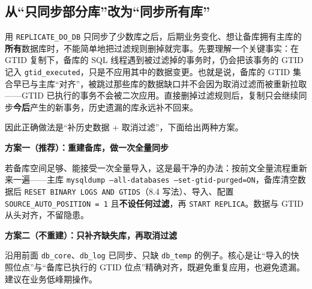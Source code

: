 \documentclass[12pt,UTF8]{ctexbook}
\begin{document}
\subsection{从“只同步部分库”改为“同步所有库”}
\label{sec:filter-to-all}

用 \texttt{REPLICATE\_DO\_DB} 只同步了少数库之后，后期业务变化、想让备库拥有主库的\textbf{所有}数据库时，不能简单地把过滤规则删掉就完事。先要理解一个关键事实：在 GTID 复制下，备库的 SQL 线程遇到被过滤掉的事务时，仍会把该事务的 GTID 记入 \texttt{gtid\_executed}，只是不应用其中的数据变更。也就是说，备库的 GTID 集合早已与主库“对齐”，被跳过那些库的数据缺口并不会因为取消过滤而被重新拉取——GTID 已执行的事务不会被二次应用。直接删掉过滤规则后，复制只会继续同步\textbf{今后}产生的新事务，历史遗漏的库永远补不回来。

因此正确做法是“补历史数据 + 取消过滤”，下面给出两种方案。

\textbf{方案一（推荐）：重建备库，做一次全量同步}

若备库空间足够、能接受一次全量导入，这是最干净的办法：按前文全量流程重新来一遍——主库 \texttt{mysqldump --all-databases --set-gtid-purged=ON}，备库清空数据后 \texttt{RESET BINARY LOGS AND GTIDS}（8.4 写法）、导入、配置 \texttt{SOURCE\_AUTO\_POSITION = 1} 且\textbf{不设任何过滤}，再 \texttt{START REPLICA}。数据与 GTID 从头对齐，不留隐患。

\textbf{方案二（不重建）：只补齐缺失库，再取消过滤}

沿用前面 \texttt{db\_core}、\texttt{db\_log} 已同步、只缺 \texttt{db\_temp} 的例子。核心是让“导入的快照位点”与“备库已执行的 GTID 位点”精确对齐，既避免重复应用，也避免遗漏。建议在业务低峰期操作。
\end{document}

